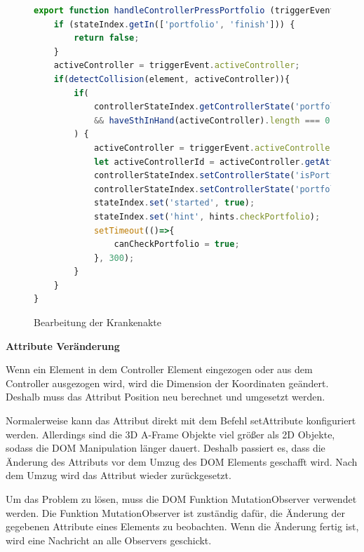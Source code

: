 \begin{figure}[ht]
\vspace*{1em}
\centering
\caption[Bearbeitung der Krankenakte]{Bearbeitung der Krankenakte}
\begin{lstlisting}[language=JavaScript, style=htmlcssjs]
export function handleControllerPressPortfolio (triggerEvent) {
    if (stateIndex.getIn(['portfolio', 'finish'])) {
        return false;
    }
    activeController = triggerEvent.activeController;
    if(detectCollision(element, activeController)){
        if(
            controllerStateIndex.getControllerState('portfolioInHand') === null
            && haveSthInHand(activeController).length === 0
        ) {
            activeController = triggerEvent.activeController;
            let activeControllerId = activeController.getAttribute('id');
            controllerStateIndex.setControllerState('isPortfolioHandling', true);
            controllerStateIndex.setControllerState('portfolioInHand', activeControllerId);
            stateIndex.set('started', true);
            stateIndex.set('hint', hints.checkPortfolio);
            setTimeout(()=>{
                canCheckPortfolio = true;
            }, 300);
        }
    }
}
\end{lstlisting}
\label{fig:portfolioPress} 
\end{figure}
  
  \vspace{1em}
  \noindent
  \textbf{Attribute Veränderung}
  \vspace{1em}
  
  \noindent
  Wenn ein Element in dem Controller Element eingezogen oder aus dem Controller ausgezogen wird, wird die Dimension der Koordinaten geändert. Deshalb muss das Attribut Position neu berechnet und umgesetzt werden.
  
  Normalerweise kann das Attribut direkt mit dem Befehl {\selectfont setAttribute} konfiguriert werden. Allerdings sind die 3D A-Frame Objekte viel größer als 2D Objekte, sodass die DOM Manipulation länger dauert. Deshalb passiert es, dass die Änderung des Attributs vor dem Umzug des DOM Elements geschafft wird. Nach dem Umzug wird das Attribut wieder zurückgesetzt.
  
  Um das Problem zu lösen, muss die DOM Funktion {\selectfont MutationObserver} verwendet werden. Die Funktion {\selectfont MutationObserver} ist zuständig dafür, die Änderung der gegebenen Attribute eines Elements zu beobachten. Wenn die Änderung fertig ist, wird eine Nachricht an alle Observers geschickt.
  
